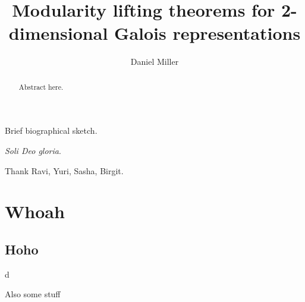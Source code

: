 \documentclass[phd,cornellheadings,draft]{cornell}
\title{Modularity lifting theorems for 2-dimensional Galois representations}
\author{Daniel Miller}
\begin{document}
\maketitle
\makecopyright

\begin{abstract}
Abstract here. 
\end{abstract}

\begin{biosketch}
Brief biographical sketch.
\end{biosketch}

\begin{dedication}
\emph{Soli Deo gloria}.
\end{dedication}

\begin{acknowledgements}
Thank Ravi, Yuri, Sasha, Birgit. 
\end{acknowledgements}

\contentspage

\normalspacing
\setcounter{page}{1}
\pagestyle{cornell}







\chapter{Whoah}

\section{Hoho}

d

Also some stuff
\end{document}
